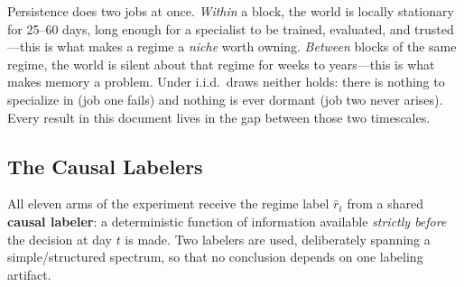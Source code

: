 \documentclass[11pt,a4paper]{article}
\theoremstyle{definition}
\theoremstyle{plain}
\begin{document}
\begin{intuition}[title={Persistence is what makes specialization purchasable}]
Persistence does two jobs at once. \emph{Within} a block, the world is locally
stationary for 25--60 days, long enough for a specialist to be trained,
evaluated, and trusted---this is what makes a regime a \emph{niche} worth
owning. \emph{Between} blocks of the same regime, the world is silent about
that regime for weeks to years---this is what makes memory a problem. Under
i.i.d.\ draws neither holds: there is nothing to specialize in (job one fails)
and nothing is ever dormant (job two never arises). Every result in this
document lives in the gap between those two timescales.
\end{intuition}

\subsection{The Causal Labelers}
\label{sec:dd2-labelers}

All eleven arms of the experiment receive the regime label $\hat r_t$ from a
shared \textbf{causal labeler}: a deterministic function of information
available \emph{strictly before} the decision at day $t$ is made. Two labelers
are used, deliberately spanning a simple/structured spectrum, so that no
conclusion depends on one labeling artifact.
\end{document}
